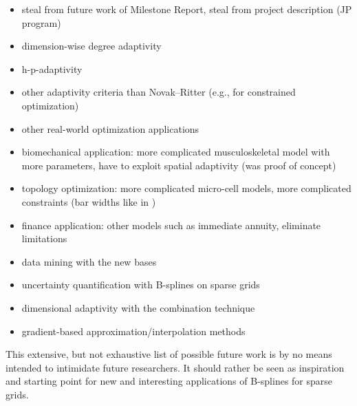 \begin{itemize}
  \item
  steal from future work of Milestone Report,
  steal from project description (JP program)
  
  \item
  dimension-wise degree adaptivity
  
  \item
  h-p-adaptivity
  
  \item
  other adaptivity criteria than Novak--Ritter
  (e.g., for constrained optimization)
  
  \item
  other real-world optimization applications
  
  \item
  biomechanical application: more complicated musculoskeletal model
  with more parameters, have to exploit spatial adaptivity
  (was proof of concept)
  
  \item
  topology optimization: more complicated micro-cell models,
  more complicated constraints (bar widths like in \cite{Allaire16Towards})
  
  \item
  finance application: other models such as immediate annuity,
  eliminate limitations
  
  \item
  data mining with the new bases
  
  \item
  uncertainty quantification with B-splines on sparse grids
  
  \item
  dimensional adaptivity with the combination technique
  
  \item
  gradient-based approximation/interpolation methods
  \cite{Baar15Gradient}
\end{itemize}

\dummytext[2]{}

This extensive, but not exhaustive list of possible future work is by no means
intended to intimidate future researchers.
It should rather be seen as inspiration and starting point
for new and interesting applications of B-splines for sparse grids.


\cleardoublepage
